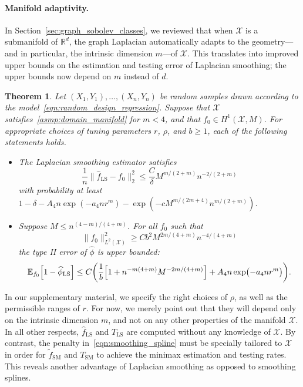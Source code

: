 \documentclass{article}
\newcommand{\Reals}{\mathbb{R}}
\newcommand{\1}{\mathbf{1}}
\newcommand{\Rd}{\Reals^d}
\newcommand{\Xset}{\mathcal{X}}
\newcommand{\Leb}{L}
\newcommand{\Ebb}{\mathbb{E}}
\newcommand{\wt}[1]{\widetilde{#1}}
\newcommand{\wh}[1]{\widehat{#1}}
\newcommand{\LS}{\mathrm{LS}}
\newcommand{\SM}{\mathrm{SM}}
\theoremstyle{alden}
\theoremstyle{aldenthm}
\newtheorem{theorem}{Theorem}
\theoremstyle{definition}
\theoremstyle{remark}
\begin{document}
\paragraph{Manifold adaptivity.} 

In Section~\ref{sec:graph_sobolev_classes}, we reviewed that when $\Xset$ is a submanifold of $\Rd$, the graph Laplacian automatically adapts to the geometry---and in particular, the intrinsic dimension $m$---of $\Xset$. This translates into improved upper bounds on the estimation and testing error of Laplacian smoothing; the upper bounds now depend on $m$ instead of $d$.

\begin{theorem}
	\label{thm:laplacian_smoothing_manifold}
	Let $(X_1,Y_1),\ldots,(X_n,Y_n)$ be random samples drawn according to the model~\eqref{eqn:random_design_regression}. Suppose that $\Xset$ satisfies~\ref{asmp:domain_manifold} for $m < 4$, and that $f_0 \in H^1(\Xset,M)$. For appropriate choices of tuning parameters $r$, $\rho$, and $b \geq 1$, each of the following statements holds.
	\begin{itemize}
		\item The Laplacian smoothing estimator satisfies
		\begin{equation*}
		\frac{1}{n}\bigl\|\wh{f}_{\LS} - f_0\bigr\|_2^2 \leq \frac{C}{\delta}M^{m/(2 + m)}n^{-2/(2 + m)}
		\end{equation*}
		with probability at least $1 - \delta - A_4n\exp(-a_4nr^m) - \exp(-c M^{m/(2m + 4)} n^{m/(2+m)})$.
		\item Suppose $M \leq n^{(4 - m)/(4 + m)}$. For all $f_0$ such that
		\begin{equation*}
		\bigl\|f_0\bigr\|_{\Leb^2(\Xset)}^2 \geq C b^2 M^{2m/(4 + m)} n^{-4/(4 + m)}
		\end{equation*} 
		the type II error of $\wh{\phi}$ is upper bounded:
		\begin{equation*}
		\Ebb_{f_0}\Bigl[1 - \wh{\phi}_{\LS} \Bigr] \leq C\biggl(\frac{1}{b}\Bigl[1 + n^{-m(4 + m)}M^{-2m/(4 + m)}\Bigr] + A_4n\exp\bigl(-a_4nr^m\bigr)\biggr).
		\end{equation*}
	\end{itemize}
\end{theorem}
In our supplementary material, we specify the right choices of $\rho$, as well as the permissible ranges of $r$. For now, we merely point out that they will depend only on the intrinsic dimension $m$, and not on any other properties of the manifold $\Xset$. In all other respects, $\wh{f}_{\LS}$ and $T_{\LS}$ are computed without any knowledge of $\Xset$. By contrast, the penalty in~\eqref{eqn:smoothing_spline} must be specially tailored to $\Xset$ in order for $\wt{f}_{\SM}$ and $T_{\SM}$ to achieve the minimax estimation and testing rates. This reveals another advantage of Laplacian smoothing as opposed to smoothing splines.
\end{document}
